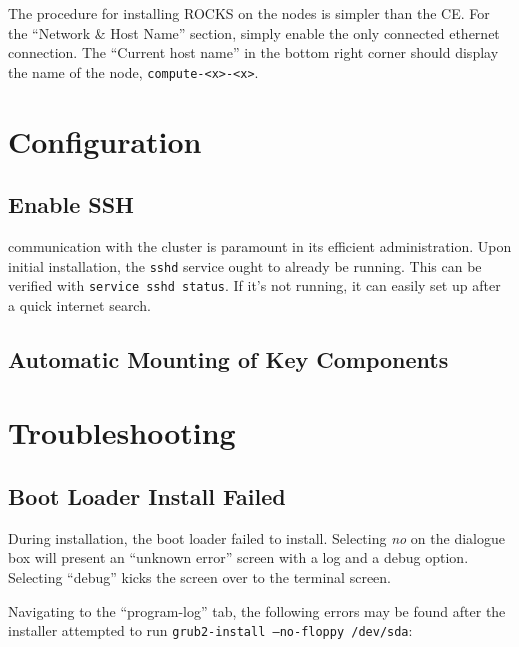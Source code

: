 \documentclass[12pt]{article}
\begin{document}
\qq The procedure for installing ROCKS on the nodes is simpler than the CE. For
the ``Network \& Host Name'' section, simply enable the only connected ethernet
connection. The ``Current host name'' in the bottom right corner should display
the name of the node, {\tt compute-<x>-<x>}. 

\qq  




\section{Configuration}

\subsection{Enable SSH}

 communication with the cluster is paramount in its efficient
administration. Upon initial installation, the {\tt sshd} service ought to
already be running. This can be verified with {\tt service sshd status}. If it's
not running, it can easily set up after a quick internet search.

\subsection{Automatic Mounting of Key Components}





\section{Troubleshooting}

\subsection{Boot Loader Install Failed}

\qq During installation, the boot loader failed to install. Selecting
\textit{no} on the dialogue box will present an ``unknown error'' screen with a
log and a debug option. Selecting ``debug'' kicks the screen over to the
terminal screen.

\qq Navigating to the ``program-log'' tab, the following errors may be found
after the installer attempted to run {\tt grub2-install --no-floppy /dev/sda}:
\end{document}
